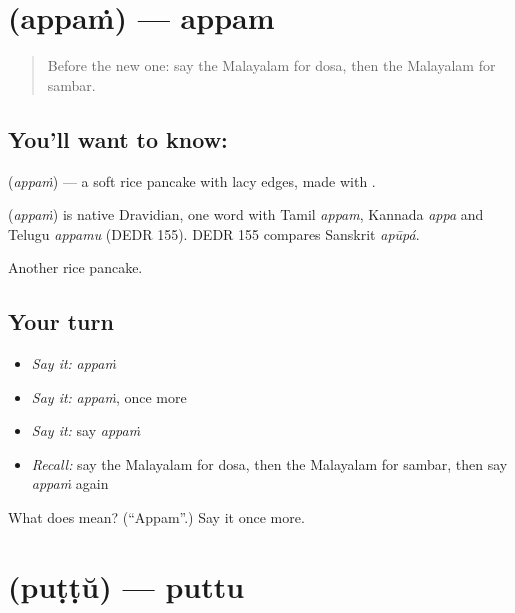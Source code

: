 \section[\texorpdfstring{\ml{അപ്പം} (appaṁ)}{അപ്പം (appaṁ)}]{ (appaṁ) — appam}

\label{lesson:ML-C132-appam}



\begin{quote}
Before the new one: say the Malayalam for dosa, then the Malayalam for sambar.
\end{quote}

\subsection*{You'll want to know: }
\textbf{} (\emph{appaṁ}) — a soft rice pancake with lacy edges, made with \textbf{}.

\begin{cousinweb}
\textbf{} (\emph{appaṁ}) is native Dravidian, one word with Tamil \emph{appam}, Kannada \emph{appa} and Telugu \emph{appamu} (DEDR 155). DEDR 155 compares Sanskrit \emph{apūpá}.
\end{cousinweb}

\begin{grammarlens}[title={What you've built}]
Another rice pancake.
\end{grammarlens}

\subsection*{Your turn}
\begin{itemize}
\raggedright
  \item \emph{Say it:} \emph{appaṁ}
  \item \emph{Say it:} \emph{appaṁ}, once more
  \item \emph{Say it:} say \emph{appaṁ}
  \item \emph{Recall:} say the Malayalam for dosa, then the Malayalam for sambar, then say \emph{appaṁ} again
\end{itemize}

\begin{tcolorbox}[breakable,colback=teal!4,colframe=teal!35!black,title={Before you move on}]
What does  mean? (\textquotedblleft{}Appam\textquotedblright{}.) Say it once more.
\end{tcolorbox}
\section[\texorpdfstring{\ml{പുട്ട്} (puṭṭŭ)}{പുട്ട് (puṭṭŭ)}]{ (puṭṭŭ) — puttu}

